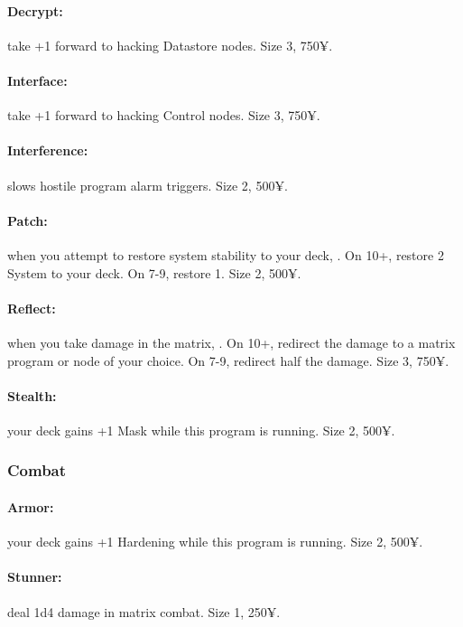 \paragraph{Decrypt:} take +1 forward to hacking Datastore nodes. Size 3, 750¥.

\paragraph{Interface:} take +1 forward to hacking Control nodes. Size 3, 750¥.

\paragraph{Interference:} slows hostile program alarm triggers. Size 2, 500¥.

\paragraph{Patch:} when you attempt to restore system stability to your deck, . On 10+, restore 2 System to your deck. On 7-9, restore 1. Size 2, 500¥.

\paragraph{Reflect:} when you take damage in the matrix, . On 10+, redirect the damage to a matrix program or node of your choice. On 7-9, redirect half the damage. Size 3, 750¥.

\paragraph{Stealth:} your deck gains +1 Mask while this program is running. Size 2, 500¥.

\subsubsection{Combat}
\paragraph{Armor:} your deck gains +1 Hardening while this program is running. Size 2, 500¥.

\paragraph{Stunner:} deal 1d4 damage in matrix combat. Size 1, 250¥.

